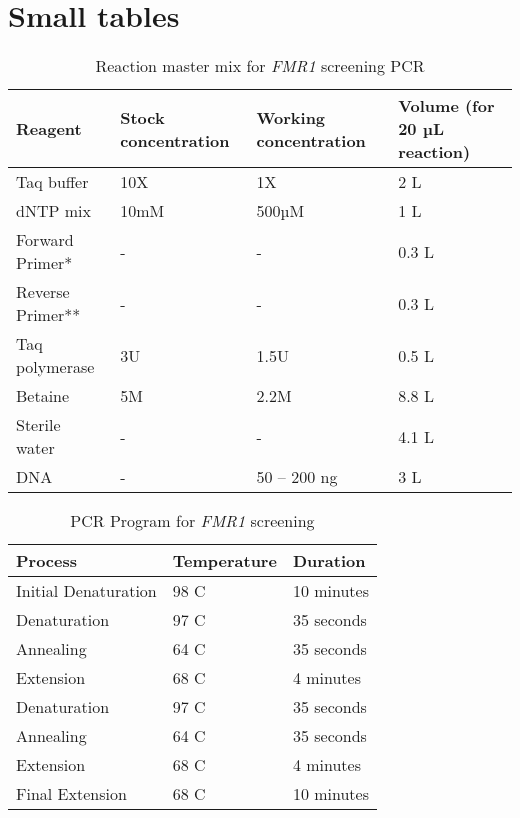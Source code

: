 \chapter{Small tables}

\begin{table}
\caption{Reaction master mix for \textit{FMR1} screening PCR}
\label{tab:chap2table2.2}

\begin{tabular}{ | l  l  l  l | }
\hline
	Reagent & Stock concentration & Working concentration & Volume (for 20 µL reaction) \\ \hline
	Taq buffer & 10X & 1X & 2 \si{\micro}L \\ \hline
	dNTP mix & 10mM & 500µM & 1 \si{\micro}L \\ \hline
	Forward Primer* & - & - & 0.3 \si{\micro}L \\ \hline
	Reverse Primer** & - & - & 0.3 \si{\micro}L \\ \hline
	Taq polymerase & 3U & 1.5U & 0.5 \si{\micro}L \\ \hline
	Betaine & 5M & 2.2M & 8.8 \si{\micro}L \\ \hline
	Sterile water  & - & - & 4.1 \si{\micro}L \\ \hline
	DNA & - & 50 – 200 ng & 3 \si{\micro}L \\ \hline
\end{tabular}
\end{table}

\begin{table}

\caption{PCR Program for \textit{FMR1} screening}
\label{tab:chap2table2.3}


\begin{tabular}{ | l  l  l | }
\hline
	Process & Temperature & Duration \\ \hline
	Initial Denaturation & 98 \textdegree C & 10 minutes \\ \hline
	Denaturation & 97 \textdegree C & 35 seconds \\ \hline
	Annealing & 64 \textdegree C & 35 seconds \\ \hline
	Extension & 68 \textdegree C & 4 minutes \\ \hline
	Denaturation & 97 \textdegree C & 35 seconds \\ \hline
	Annealing & 64 \textdegree C & 35 seconds \\ \hline
	Extension & 68 \textdegree C & 4 minutes \\ \hline
	Final Extension & 68 \textdegree C & 10 minutes \\ \hline
\end{tabular}
\end{table}

